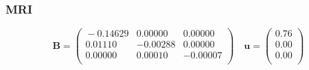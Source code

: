 \documentclass[draft,linenumbers]{agujournal}
\begin{document}
\subsubsection*{MRI}
\begin{equation}
\mathbf{B} =
\begin{pmatrix}{}
  -0.14629 & 0.00000 & 0.00000 \\ 
  0.01110 & -0.00288 & 0.00000 \\ 
  0.00000 & 0.00010 & -0.00007 \\ 
  \end{pmatrix}
\quad {\bm u} =
\begin{pmatrix}{}
  0.76 \\ 
  0.00 \\ 
  0.00 \\ 
  \end{pmatrix}
\end{equation}
\end{document}
